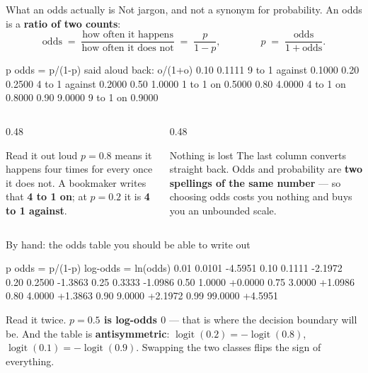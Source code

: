 \documentclass[aspectratio=169]{beamer}
\begin{document}
\begin{frame}[fragile,shrink=6]{What an odds actually is}
Not jargon, and not a synonym for probability. An odds is a \textbf{ratio of
two counts}:
\[
  \text{odds} \;=\; \frac{\text{how often it happens}}{\text{how often it does
  not}} \;=\; \frac{p}{1-p},
  \qquad\qquad
  p \;=\; \frac{\text{odds}}{1 + \text{odds}} .
\]
\begin{outblk}
       p odds = p/(1-p)         said aloud  back: o/(1+o)
    0.10         0.1111     9 to 1 against         0.1000
    0.20         0.2500     4 to 1 against         0.2000
    0.50         1.0000          1 to 1 on         0.5000
    0.80         4.0000          4 to 1 on         0.8000
    0.90         9.0000          9 to 1 on         0.9000
\end{outblk}
\begin{columns}[T]
  \begin{column}{0.48\textwidth}
    \begin{block}{Read it out loud}
      \small $p = 0.8$ means it happens four times for every once it does
      not. A bookmaker writes that \textbf{4 to 1 on}; at $p = 0.2$ it is
      \textbf{4 to 1 against}.
    \end{block}
  \end{column}
  \begin{column}{0.48\textwidth}
    \begin{alertblock}{Nothing is lost}
      \small The last column converts straight back. Odds and probability
      are \textbf{two spellings of the same number} --- so choosing odds
      costs you nothing and buys you an unbounded scale.
    \end{alertblock}
  \end{column}
\end{columns}
\end{frame}

\begin{frame}[fragile,shrink=8]{By hand: the odds table you should be able to write out}
\begin{outblk}
 p        odds = p/(1-p)      log-odds = ln(odds)
 0.01          0.0101             -4.5951
 0.10          0.1111             -2.1972
 0.20          0.2500             -1.3863
 0.25          0.3333             -1.0986
 0.50          1.0000             +0.0000
 0.75          3.0000             +1.0986
 0.80          4.0000             +1.3863
 0.90          9.0000             +2.1972
 0.99         99.0000             +4.5951
\end{outblk}
\begin{center}\small
  Read it twice. \textbf{$p = 0.5$ is log-odds $0$} --- that is where the
  decision boundary will be. And the table is \textbf{antisymmetric}:
  $\operatorname{logit}(0.2) = -\operatorname{logit}(0.8)$,
  $\operatorname{logit}(0.1) = -\operatorname{logit}(0.9)$. Swapping the two
  classes flips the sign of everything.
\end{center}
\end{frame}
\end{document}
